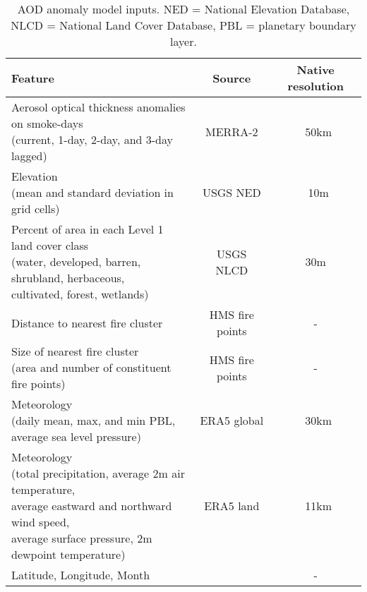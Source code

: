 \begin{table}[H]
    \centering
    \caption{AOD anomaly model inputs. NED = National Elevation Database, NLCD = National Land Cover Database, PBL = planetary boundary layer.}
    \begin{tabular}{l|c|c}
        Feature & Source & Native resolution\\
        \hline
        \hline
        \shortstack[l]{Aerosol optical thickness anomalies on smoke-days\\ (current, 1-day, 2-day, and 3-day lagged)}& MERRA-2 & ~50km\\
        \hline 
        \shortstack[l]{Elevation \\ (mean and standard deviation in grid cells)} & USGS NED & ~10m \\
        \hline
        \shortstack[l]{Percent of area in each Level 1 land cover class \\ (water, developed, barren, shrubland, herbaceous,\\cultivated, forest, wetlands)} & USGS NLCD & 30m \\
        \hline 
        Distance to nearest fire cluster & HMS fire points & - \\
        \hline 
        \shortstack[l]{Size of nearest fire cluster \\ (area and number of constituent fire points)} & HMS fire points & - \\
        \hline 
        \shortstack[l]{Meteorology \\ (daily mean, max, and min PBL,\\average sea level pressure)} & ERA5 global & ~30km \\
        \hline
        \shortstack[l]{Meteorology \\ (total precipitation, average 2m air temperature,\\ average eastward and northward wind speed,\\ average surface pressure, 2m dewpoint temperature)} & ERA5 land & ~11km \\
        \hline 
        Latitude, Longitude, Month & & - \\
    \end{tabular}
    \label{tab:aodinputs}
\end{table}
